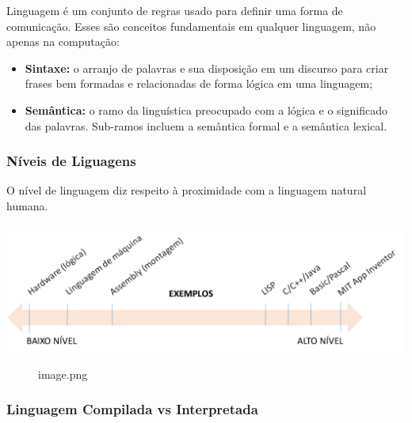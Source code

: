 \documentclass[12pt,a4paper]{article}
\providecommand{\tightlist}{%
      \setlength{\itemsep}{0pt}\setlength{\parskip}{0pt}}
\begin{document}
    Linguagem é um conjunto de regras usado para definir uma forma de
comunicação. Esses são conceitos fundamentais em qualquer linguagem, não
apenas na computação:

\begin{itemize}
\tightlist
\item
  \textbf{Sintaxe:} o arranjo de palavras e sua disposição em um
  discurso para criar frases bem formadas e relacionadas de forma lógica
  em uma linguagem;
\item
  \textbf{Semântica:} o ramo da linguística preocupado com a lógica e o
  significado das palavras. Sub-ramos incluem a semântica formal e a
  semântica lexical.
\end{itemize}

    \hypertarget{nuxedveis-de-liguagens}{%
\subsubsection{Níveis de Liguagens}\label{nuxedveis-de-liguagens}}

    O nível de linguagem diz respeito à proximidade com a linguagem natural
humana.

\includegraphics{"figs/image03.png"}

    \begin{figure}
\centering
\caption{image.png}
\end{figure}

    \hypertarget{linguagem-compilada-vs-interpretada}{%
\subsubsection{Linguagem Compilada vs
Interpretada}\label{linguagem-compilada-vs-interpretada}}
\end{document}
